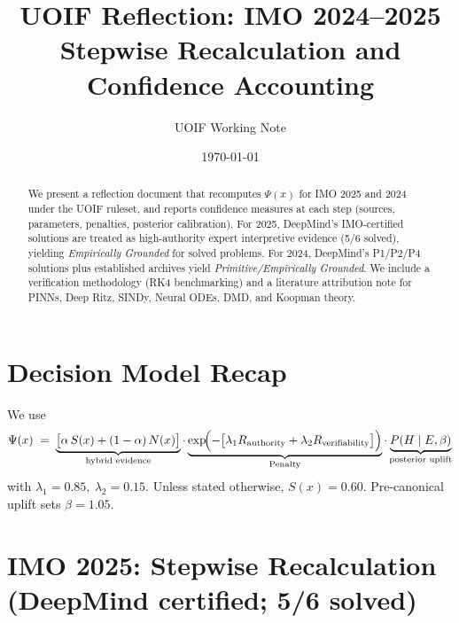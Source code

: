 \documentclass[11pt]{article}
\title{UOIF Reflection: IMO 2024--2025 Stepwise Recalculation and Confidence Accounting}
\author{UOIF Working Note}
\date{\today}
\newcommand{\Sx}{S(x)}
\newcommand{\Nx}{N(x)}
\newcommand{\Px}{\Psi(x)}
\newcommand{\post}{P(H\mid E,\beta)}
\newcommand{\pen}{\mathrm{Penalty}}
\begin{document}
\maketitle

\begin{abstract}
We present a reflection document that recomputes $\Px$ for IMO 2025 and 2024 under the UOIF ruleset, and reports confidence measures at each step (sources, parameters, penalties, posterior calibration). For 2025, DeepMind's IMO-certified solutions are treated as high-authority expert interpretive evidence (5/6 solved), yielding \emph{Empirically Grounded} for solved problems. For 2024, DeepMind's P1/P2/P4 solutions plus established archives yield \emph{Primitive/Empirically Grounded}. We include a verification methodology (RK4 benchmarking) and a literature attribution note for PINNs, Deep Ritz, SINDy, Neural ODEs, DMD, and Koopman theory.
\end{abstract}

\section{Decision Model Recap}
We use
\[
\Px \;=\; \underbrace{\bigl[\alpha\,\Sx + (1-\alpha)\,\Nx\bigr]}_{\text{hybrid evidence}}
\cdot
\underbrace{\exp\!\Bigl(-\bigl[\lambda_1 R_{\text{authority}}+\lambda_2 R_{\text{verifiability}}\bigr]\Bigr)}_{\pen}
\cdot
\underbrace{\post}_{\text{posterior uplift}}
\]
with $\lambda_1=0.85,\ \lambda_2=0.15$. Unless stated otherwise, $\Sx=0.60$. Pre-canonical uplift sets $\beta=1.05$.

\section{IMO 2025: Stepwise Recalculation (DeepMind certified; 5/6 solved)}
\end{document}
